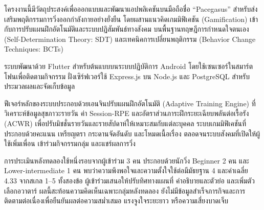 %
โครงงานนี้มีวัตถุประสงค์เพื่อออกแบบและพัฒนาแอปพลิเคชันบนมือถือชื่อ ``Pacegasus'' สำหรับส่งเสริมพฤติกรรมการวิ่งออกกำลังกายอย่างยั่งยืน โดยผสานแนวคิดเกมมิฟิเคชัน (Gamification) เข้ากับการปรับแผนฝึกอัตโนมัติและระบบปฏิสัมพันธ์ทางสังคม บนพื้นฐานทฤษฎีการกำหนดใจตนเอง (Self-Determination Theory: SDT) และเทคนิคการเปลี่ยนพฤติกรรม (Behavior Change Techniques: BCTs)

ระบบพัฒนาด้วย Flutter สำหรับต้นแบบบนระบบปฏิบัติการ Android โดยใช้เซนเซอร์ในสมาร์ตโฟนเพื่อติดตามกิจกรรม ฝั่งเซิร์ฟเวอร์ใช้ Express.js บน Node.js และ PostgreSQL สำหรับประมวลผลและจัดเก็บข้อมูล

ฟีเจอร์หลักของระบบประกอบด้วยเอนจินปรับแผนฝึกอัตโนมัติ (Adaptive Training Engine) ที่วิเคราะห์ข้อมูลสุขภาวะรายวัน ค่า Session-RPE และอัตราส่วนภาระฝึกระยะเฉียบพลันต่อเรื้อรัง (ACWR) เพื่อปรับมิชชั่นรายวันและรายสัปดาห์ให้เหมาะสมกับแต่ละบุคคล ระบบเกมมิฟิเคชันที่ประกอบด้วยคะแนน เหรียญตรา กระดานจัดอันดับ และโหมดเนื้อเรื่อง ตลอดจนระบบสังคมที่เปิดให้ผู้ใช้เพิ่มเพื่อน เข้าร่วมกิจกรรมกลุ่ม และแชร์ผลการวิ่ง

การประเมินหลังทดลองใช้หนึ่งรอบจากผู้เข้าร่วม 3 คน ประกอบด้วยนักวิ่ง Beginner 2 คน และ Lower-intermediate 1 คน พบว่าความพึงพอใจและความตั้งใจใช้ต่อมีมัธยฐาน 4 และค่าเฉลี่ย 4.33 จากสเกล 1--5 ทั้งสองข้อ ผู้เข้าร่วมเสนอให้ปรับทิศทางแผนที่ คำอธิบายและตัวย่อ และเพิ่มตัวเลือกอวาตาร์ ผลนี้สะท้อนความคิดเห็นเฉพาะกลุ่มหลังทดลอง ยังไม่มีข้อมูลสำเร็จภารกิจและการติดตามต่อเนื่องเพื่อยืนยันผลต่อความสม่ำเสมอ แรงจูงใจระยะยาว หรือความเสี่ยงบาดเจ็บ
